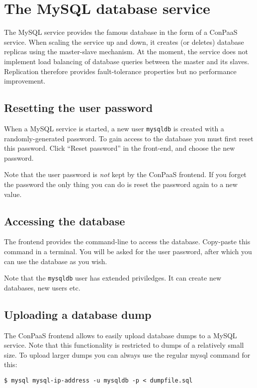 \documentclass[10pt]{article}
\begin{document}
\section{The MySQL database service}

The MySQL service provides the famous database in the form of a
ConPaaS service. When scaling the service up and down, it creates (or
deletes) database replicas using the master-slave mechanism. At the
moment, the service does not implement load balancing of database
queries between the master and its slaves. Replication therefore
provides fault-tolerance properties but no performance improvement.

\subsection{Resetting the user password}

When a MySQL service is started, a new user \texttt{mysqldb} is
created with a randomly-generated password. To gain access to the
database you must first reset this password. Click ``Reset password''
in the front-end, and choose the new password.

Note that the user password is \emph{not} kept by the ConPaaS
frontend. If you forget the password the only thing you can do is
reset the password again to a new value.

\subsection{Accessing the database} 

The frontend provides the command-line to access the database.
Copy-paste this command in a terminal. You will be asked for the user
password, after which you can use the database as you wish.

Note that the \texttt{mysqldb} user has extended priviledges. It can
create new databases, new users etc.

\subsection{Uploading a database dump}

The ConPaaS frontend allows to easily upload database dumps to a MySQL service. Note that this functionality is restricted to dumps of a relatively small size. To upload larger dumps you can always use the regular mysql command for this:
\begin{verbatim}
$ mysql mysql-ip-address -u mysqldb -p < dumpfile.sql
\end{verbatim}
\end{document}
